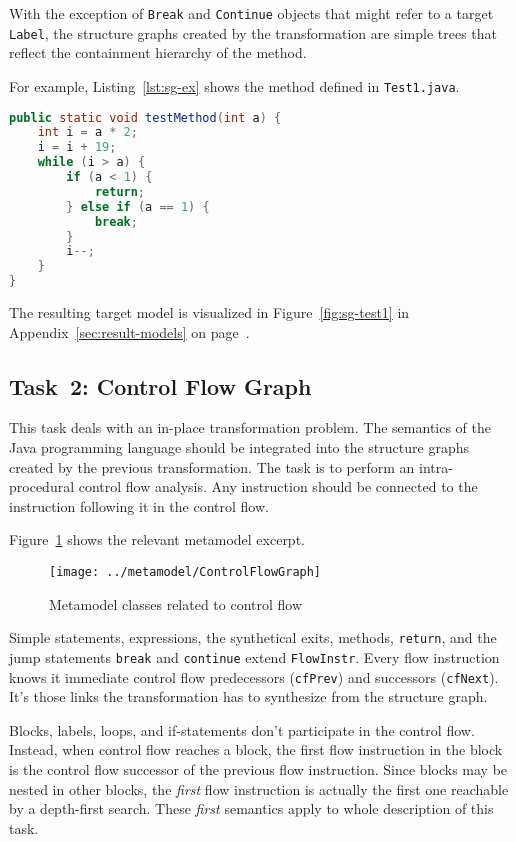 \documentclass[submission,copyright,creativecommons]{eptcs}
\begin{document}
With the exception of \verb|Break| and \verb|Continue| objects that might refer
to a target \verb|Label|, the structure graphs created by the transformation
are simple trees that reflect the containment hierarchy of the method.

For example, Listing~\ref{lst:sg-ex} shows the method defined in
\verb|Test1.java|.

\begin{lstlisting}[language=Java,caption={An example Java method (\texttt{Test1.java})},label={lst:sg-ex}]
public static void testMethod(int a) {
    int i = a * 2;
    i = i + 19;
    while (i > a) {
        if (a < 1) {
            return;
        } else if (a == 1) {
            break;
        }
        i--;
    }
}
\end{lstlisting}

The resulting target model is visualized in Figure~\ref{fig:sg-test1} in
Appendix~\ref{sec:result-models} on page~\pageref{fig:sg-test1}.


\subsection{Task~2: Control Flow Graph}
\label{sec:task2-cf-graph}

This task deals with an in-place transformation problem.  The semantics of the
Java programming language should be integrated into the structure graphs
created by the previous transformation.  The task is to perform an
intra-procedural control flow analysis.  Any instruction should be connected to
the instruction following it in the control flow.

Figure~\ref{fig:control-flow-mm} shows the relevant metamodel excerpt.

\begin{figure}[h!]
  \centering
  \texttt{[image: ../metamodel/ControlFlowGraph]}
  \caption{Metamodel classes related to control flow}
  \label{fig:control-flow-mm}
\end{figure}

Simple statements, expressions, the synthetical exits, methods, \verb|return|,
and the jump statements \verb|break| and \verb|continue| extend
\verb|FlowInstr|.  Every flow instruction knows it immediate control flow
predecessors (\verb|cfPrev|) and successors (\verb|cfNext|).  It's those links
the transformation has to synthesize from the structure graph.

Blocks, labels, loops, and if-statements don't participate in the control flow.
Instead, when control flow reaches a block, the first flow instruction in the
block is the control flow successor of the previous flow instruction.  Since
blocks may be nested in other blocks, the \emph{first} flow instruction is
actually the first one reachable by a depth-first search.  These \emph{first}
semantics apply to whole description of this task.
\end{document}
